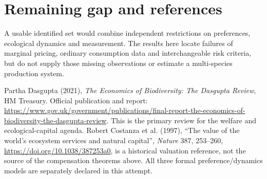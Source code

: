 \documentclass[11pt,a4paper]{article}
\theoremstyle{definition}
\theoremstyle{remark}
\begin{document}
\section{Remaining gap and references}
A usable identified set would combine independent restrictions on preferences, ecological dynamics and measurement. The results here locate failures of marginal pricing, ordinary consumption data and interchangeable risk criteria, but do not supply those missing observations or estimate a multi-species production system.

Partha Dasgupta (2021), \emph{The Economics of Biodiversity: The Dasgupta Review}, HM Treasury. Official publication and report: \url{https://www.gov.uk/government/publications/final-report-the-economics-of-biodiversity-the-dasgupta-review}. This is the primary review for the welfare and ecological-capital agenda. Robert Costanza et al. (1997), ``The value of the world's ecosystem services and natural capital'', \emph{Nature} 387, 253--260, \url{https://doi.org/10.1038/387253a0}, is a historical valuation reference, not the source of the compensation theorems above. All three formal preference/dynamics models are separately declared in this attempt.
\end{document}
